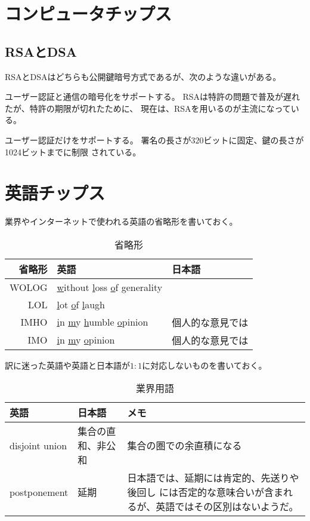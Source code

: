 \section{コンピュータチップス}\label{s1:コンピュータチップス} %
	\subsection{RSAとDSA}\label{s2:RSAとDSA} %
		RSAとDSAはどちらも公開鍵暗号方式であるが、次のような違いがある。
		\begin{description}\setlength{\itemsep}{-1mm} %
			\item[RSA] ユーザー認証と通信の暗号化をサポートする。
			RSAは特許の問題で普及が遅れたが、特許の期限が切れたために、
			現在は、RSAを用いるのが主流になっている。
			\item[DSA] ユーザー認証だけをサポートする。
			署名の長さが$320$ビットに固定、鍵の長さが1024ビットまでに制限
			されている。
		\end{description} %
\section{英語チップス}\label{s1:英語チップス} %
	業界やインターネットで使われる英語の省略形を書いておく。
	\begin{table}[htbp] %
		\begin{center}\begin{tabular}{rll} \hline
			省略形 & 英語 & 日本語 \\ \hline
			WOLOG & \underline{w}ithout \underline{l}oss \underline{o}f
				\underline{g}enerality \\
			LOL & \underline{l}ot \underline{o}f \underline{l}augh \\
			IMHO & \underline{i}n \underline{m}y \underline{h}umble
				\underline{o}pinion & 個人的な意見では \\
			IMO & \underline{i}n \underline{m}y \underline{o}pinion
				& 個人的な意見では \\
		\end{tabular}\end{center}
		\caption{省略形}
	\end{table} %

	訳に迷った英語や英語と日本語が$1:1$に対応しないものを書いておく。
	\begin{table}[htbp] %
		\begin{center}\begin{tabular}{lll} \hline
			英語 & 日本語 & メモ \\ \hline
			disjoint union & 集合の直和、非公和 & 集合の圏での余直積になる \\
			postponement & 延期 & 日本語では、延期には肯定的、先送りや後回し
			には否定的な意味合いが含まれるが、英語ではその区別はないようだ。 \\
		\end{tabular}\end{center}
		\caption{業界用語}
	\end{table} %
